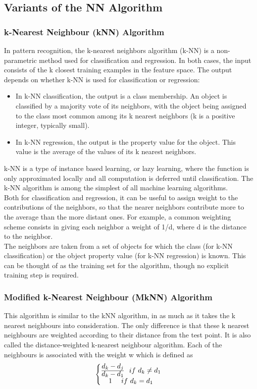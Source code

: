 \subsection{Variants of the NN Algorithm}
\subsubsection{k-Nearest Neighbour (kNN) Algorithm}
In pattern recognition, the k-nearest neighbors algorithm (k-NN) is a non-parametric method used for classification and regression.  In both cases, the input consists of the k closest training examples in the feature space. The output depends on whether k-NN is used for classification or regression:
\begin{itemize}
\item In k-NN classification, the output is a class membership. An object is classified by a majority vote of its neighbors, with the object being assigned to the class most common among its k nearest neighbors (k is a positive integer, typically small). 
\item In k-NN regression, the output is the property value for the object. This value is the average of the values of its k nearest neighbors.
\end{itemize}

k-NN is a type of instance based learning, or lazy learning, where the function is only approximated locally and all computation is deferred until classification. The k-NN algorithm is among the simplest of all machine learning algorithms.\\ Both for classification and regression, it can be useful to assign weight to the contributions of the neighbors, so that the nearer neighbors contribute more to the average than the more distant ones. For example, a common weighting scheme consists in giving each neighbor a weight of 1/d, where d is the distance to the neighbor.\\ The neighbors are taken from a set of objects for which the class (for k-NN classification) or the object property value (for k-NN regression) is known. This can be thought of as the training set for the algorithm, though no explicit training step is required.

\subsubsection{Modified k-Nearest Neighbour (MkNN) Algorithm}
This algorithm is similar to the kNN algorithm, in as much as it takes the k nearest
neighbours into consideration. The only difference is that these k nearest neighbours
are weighted according to their distance from the test point. It is also called
the distance-weighted k-nearest neighbour algorithm. Each of the neighbours is
associated with the weight w which is defined as
$$ \left\{\begin{matrix}
\frac{ \mathlarger{d_{k} - d_{j}}} { \mathlarger{{d_{k} - d_{1}} }} \   \ if \ d_{k} \neq d_{1} \\ 
\mathlarger{1} \  \   \     \ if \ d_{k}  =  d_{1}
\end{matrix}\right.   $$

